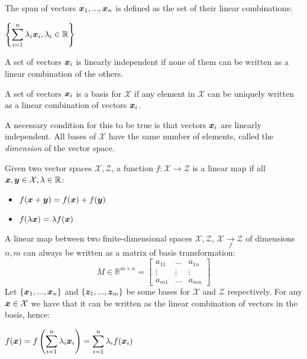 \newpage
\begin{definition}[Span]
The span of vectors $\bm{x}_1, ..., \bm{x}_n$ is defined as the set of their linear combinations:
\begin{center}
	$\displaystyle \left\{\displaystyle\sum_{i=1}^n\lambda_i\bm{x}_i,\lambda_i\in\mathbb{R} \right\}$
\end{center}
\end{definition}
\begin{definition}
A set of vectors $\bm{x}_i$ is linearly independent if none of them can be written as a linear combination of the others.
\end{definition}
\begin{definition}[Basis]
A set of vectors $\bm{x}_i$ is a basis for $\mathcal{X}$ if any element in $\mathcal{X}$ can be uniquely written as a linear combination of vectors $\bm{x}_i$.
\end{definition}
A necessary condition for this to be true is that vectors $\bm{x}_i$ are linearly independent. All bases of $\mathcal{X}$ have the same number of elements, called the \textit{dimension} of the vector space.\newline
\begin{definition}
Given two vector spaces $\mathcal{X}, \mathcal{Z}$, a function $f:\mathcal{X}\rightarrow\mathcal{Z}$ is a linear map if all $\bm{x},\bm{y}\in\mathcal{X},\lambda\in\mathbb{R}$:
\begin{itemize}
	\item $f(\bm{x}+\bm{y})=f(\bm{x})+f(\bm{y})$
	\item $f(\lambda\bm{x})=\lambda f(\bm{x})$
\end{itemize}
\end{definition}
A linear map between two finite-dimensional spaces $\mathcal{X}, \mathcal{Z}$, $\mathcal{X}\xrightarrow[f]{}\mathcal{Z}$ of dimensions $n,m$ can always be written as a matrix of basis transformation:
\[M\in\mathbb{R}^{m\times n}=
\begin{bmatrix}
	a_{11} & \hdots & a_{1n}\\
	\vdots & \vdots & \vdots\\
	a_{m1} & \hdots & a_{mn}
\end{bmatrix}
\]
Let $\{\bm{x}_1,...,\bm{x}_n\}$ and $\{\bm{z}_1,...,\bm{z}_m\}$ be some bases for $\mathcal{X}$ and $\mathcal{Z}$ respectively. For any $\bm{x}\in\mathcal{X}$ we have that it can be written as the linear combination of vectors in the basis, hence:
\begin{center}
	$\displaystyle f(\bm{x})=f\left(\displaystyle\sum_{i=1}^n\lambda_i\bm{x}_i\right)=\displaystyle\sum_{i=1}^n\lambda_if(\bm{x}_i)$\\
\end{center}
